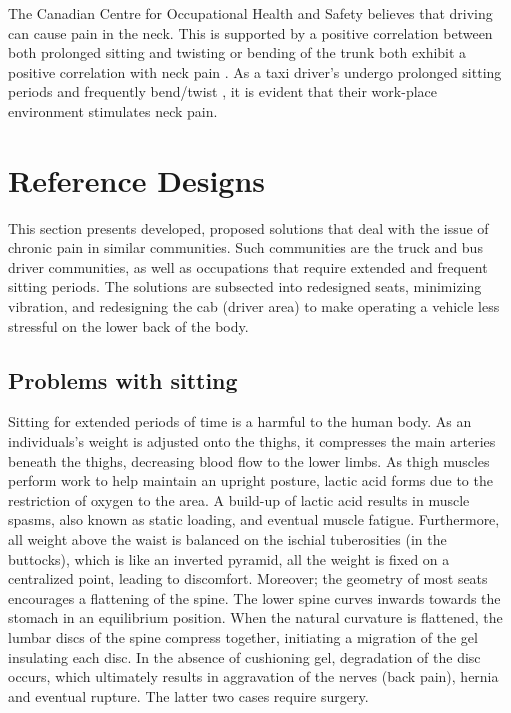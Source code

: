 \documentclass[11pt]{article}
\begin{document}
The Canadian Centre for Occupational Health and Safety believes that driving can cause pain in the 
neck\cite{proof}. This is supported by a positive correlation between both prolonged sitting and 
twisting or bending of the trunk both exhibit a positive correlation with neck pain \cite{neck}. 
As a taxi driver’s undergo prolonged sitting periods and frequently bend/twist \cite{Okunribido2008, POSTUALTED},
it is evident that their work-place environment stimulates neck pain. 

\section{Reference Designs}
\label{sec:designs}

This section presents developed, proposed solutions that deal with the issue of
chronic pain in similar communities. Such communities are the truck and bus driver communities, as well as occupations 
that require extended and frequent sitting periods. The solutions are subsected into
redesigned seats, minimizing vibration, and redesigning the cab (driver area) to make operating a vehicle
less stressful on the lower back of the body.

\subsection{Problems with sitting}
\label{sec:sittingproblems}

Sitting for extended periods of time is a harmful to the human body. As an individuals's weight is adjusted
onto the thighs, it compresses the main arteries beneath the thighs, decreasing 
blood flow to the lower limbs. As thigh muscles perform work to help maintain an upright posture, 
lactic acid forms due to the restriction of oxygen to the area. A build-up of lactic acid results in muscle spasms, also known as static
loading, and eventual muscle fatigue. Furthermore, all weight above the waist is balanced on the ischial 
tuberosities (in the buttocks), which is like an inverted pyramid, all the weight is 
fixed on a centralized point, leading to discomfort. Moreover; the geometry of most seats encourages a flattening of the 
spine. The lower spine curves inwards towards the stomach in an equilibrium position. When the natural curvature 
is flattened, the lumbar discs of the spine compress together, initiating a migration of 
the gel insulating each disc. In the absence of cushioning gel, degradation of the disc occurs, which 
ultimately results in aggravation of the nerves (back pain), hernia and eventual rupture. The latter two cases
require surgery\cite{ergoCentricAnatomy2011}.
\end{document}
